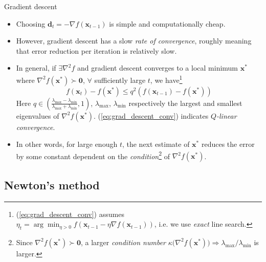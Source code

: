 \documentclass{beamer}
\numberwithin{equation}{section}
\newcommand{\aref}[1]{\alert{\ref{#1}}}
\begin{document}
\begin{frame}{Gradient descent}
    \begin{itemize}
        \item
        Choosing $ \mathbf{d}_t = -\nabla f(\mathbf{x}_{t - 1}) $ is simple
        and computationally cheap.

        \item
        However, gradient descent has a slow \textit{rate of convergence},
        roughly meaning that error reduction per iteration is relatively slow.

        \item
        In general, if $ \exists \nabla^2f $ and gradient descent converges to
        a local minimum $ \mathbf{x}^* $ where $ \nabla^2f(\mathbf{x}^*) \succ
        \mathbf{0} $, $ \forall $ sufficiently large $ t $, we have\footnote{
            (\aref{eq:grad_descent_conv}) assumes
            $ \eta_t = \arg\min_{\eta > 0}f(\mathbf{x}_{t - 1} - \eta
            \nabla f(\mathbf{x}_{t - 1})) $, i.e. we use \textit{exact}
            line search.
        }
        \cite{nocedal_opt}
        \begin{equation} \label{eq:grad_descent_conv}
            f(\mathbf{x}_t) - f(\mathbf{x}^*) \le q^2(f(\mathbf{x}_{t - 1}) -
            f(\mathbf{x}^*))
        \end{equation}
        Here $ q \in \left(\frac{\lambda_{\max} -
        \lambda_{\min}}{\lambda_{\max} + \lambda_{\min}}, 1\right) $,
        $ \lambda_{\max} $, $ \lambda_{\min} $ respectively the largest and
        smallest eigenvalues of $ \nabla^2f(\mathbf{x}^*) $. 
        (\aref{eq:grad_descent_conv}) indicates
        $ Q $\textit{-linear convergence}.

        \item
        In other words, for large enough $ t $, the next estimate of
        $ \mathbf{x}^* $ reduces the error by some constant dependent on the
        \textit{condition}\footnote{
            Since $ \nabla^2f(\mathbf{x}^*) \succ \mathbf{0} $, a larger
            \textit{condition number} $ \kappa\big(\nabla^2f(\mathbf{x}^*)\big)
            \Rightarrow \lambda_{\max} / \lambda_{\min} $ is larger.
        } of $ \nabla^2 f(\mathbf{x}^*) $.
    \end{itemize}

    \medskip
\end{frame}

\subsection{Newton's method}
\end{document}
